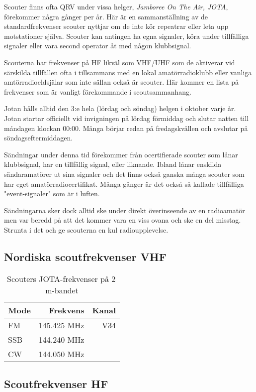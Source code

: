 Scouter finns ofta QRV under vissa helger, \textit{Jamboree On The Air, JOTA},
förekommer några gånger per år. Här är en sammanställning av de
standardfrekvenser scouter nyttjar om de inte kör repeatrar eller leta upp
motstationer själva. Scouter kan antingen ha egna signaler, köra under
tillfälliga signaler eller vara second operator åt med någon klubbsignal.

Scouterna har frekvenser på HF likväl som VHF/UHF som de aktiverar vid
särskilda tillfällen ofta i tillsammans med en lokal amatörradioklubb eller
vanliga amtörradioeldsjälar som inte sällan också är scouter. Här kommer en
lista på frekvenser som är vanligt förekommande i scoutsammanhang.

Jotan hålls alltid den 3:e hela (lördag och söndag) helgen i oktober varje år.
Jotan startar officiellt vid invigningen på lördag förmiddag och slutar natten
till måndagen klockan 00:00. Många börjar redan på fredagskvällen och avslutar
på söndagseftermiddagen.

Sändningar under denna tid förekommer från ocertifierade scouter som lånar
klubbsignal, har en tillfällig signal, eller liknande. Ibland lånar
enskilda sändaramatörer ut sina signaler och det finns också ganska många
scouter som har eget amatörradiocertifikat. Många gånger är det också så
kallade tillfälliga "event-signaler" som är i luften.

Sändningarna sker dock alltid ske under direkt överinseende av en radioamatör
men var beredd på att det kommer vara en viss ovana och ske en del misstag.
Strunta i det och ge scouterna en kul radioupplevelse.

\subsection{Nordiska scoutfrekvenser VHF}

\begin{table}[h]
\centering
\begin{tabular}{lrr}
	\textbf{Mode} & \textbf{Frekvens} & \textbf{Kanal} \\ \hline
	FM            &      145.425  MHz &   V34 \\
	SSB           &      144.240  MHz &  \\
	CW            &      144.050  MHz &
\end{tabular}
\caption{Scouters JOTA-frekvenser på 2\,m-bandet}
\end{table}

\subsection{Scoutfrekvenser HF}

